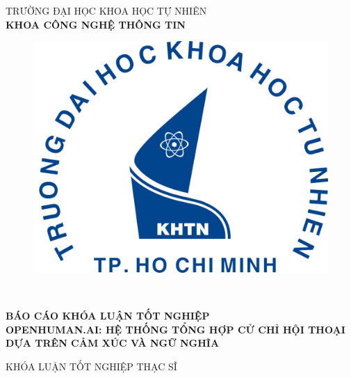 \begin{titlepage}

\begin{center}
TRƯỜNG ĐẠI HỌC KHOA HỌC TỰ NHIÊN\\
\textbf{KHOA CÔNG NGHỆ THÔNG TIN}\\[2cm]

\begin{figure}[htp]
\centering
\includegraphics[width=8 cm]{images/logo-khtn.png}
{\\[1cm]}
\end{figure}

{ \Large \bfseries \tenSV \\[1cm] } 


{ \Large \bfseries BÁO CÁO KHÓA LUẬN TỐT NGHIỆP \\
OPENHUMAN.AI: HỆ THỐNG TỔNG HỢP CỬ CHỈ HỘI THOẠI DỰA TRÊN CẢM XÚC VÀ NGỮ NGHĨA \\[2cm]}


\large KHÓA LUẬN TỐT NGHIỆP THẠC SĨ\\




\end{center}
\end{titlepage}
